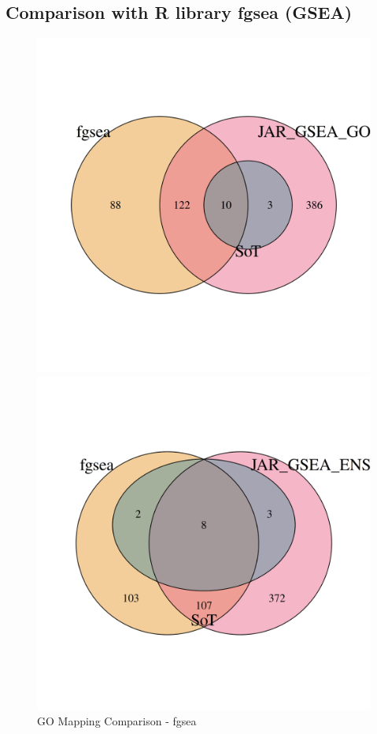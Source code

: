 \documentclass[12pt]{article}
\begin{document}
\subsection{Comparison with R library fgsea (GSEA)}\label{sec:Comparison-of-GSEA}
\begin{figure}[htpb]
    \centering
    \begin{minipage}{0.49\textwidth}
        \centering
        \includegraphics[width=\textwidth]{./plots/go_mappingCompfgsea.png}
        \caption{GO Mapping Comparison - fgsea}
        \label{fig:go-mapping-fgsea}
    \end{minipage}
    \hfill
    \begin{minipage}{0.49\textwidth}
        \centering
        \includegraphics[width=\textwidth]{./plots/ens_mappingCompgfgsea.png}

\end{minipage}
\end{figure}
\end{document}
